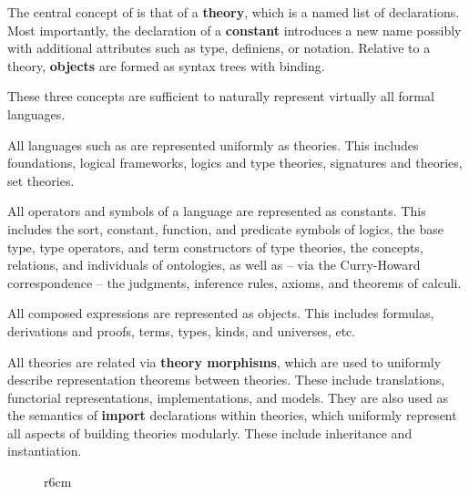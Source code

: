 The central concept of \mmt is that of a \textbf{theory}, which is a named list of declarations.
Most importantly, the declaration of a \textbf{constant} introduces a new name possibly with additional attributes such as type, definiens, or notation.
Relative to a theory, \textbf{objects} are formed as syntax trees with binding.

These three concepts are sufficient to naturally represent virtually all formal languages.
\begin{compactitem}
\item All languages such as are represented uniformly as {\mmt} theories.
This includes foundations, logical frameworks, logics and type theories, signatures and theories, set theories.
\item All operators and symbols of a language are represented as \mmt constants.
This includes the sort, constant, function, and predicate symbols of logics, the base type, type operators, and term constructors of type theories, the concepts, relations, and individuals of ontologies, as well as -- via the Curry-Howard correspondence -- the judgments, inference rules, axioms, and theorems of calculi.
\item All composed expressions are represented as objects.
This includes formulas, derivations and proofs, terms, types, kinds, and universes, etc.
\end{compactitem}

All {\mmt} theories are related via \textbf{theory morphisms}, which are used to uniformly describe representation theorems between theories.
These include translations, functorial representations, implementations, and models.
They are also used as the semantics of \textbf{import} declarations within theories, which uniformly represent all aspects of building theories modularly.
These include inheritance and instantiation.

\begin{figure}r{6cm}
\vspace{-1em}
\end{figure}

